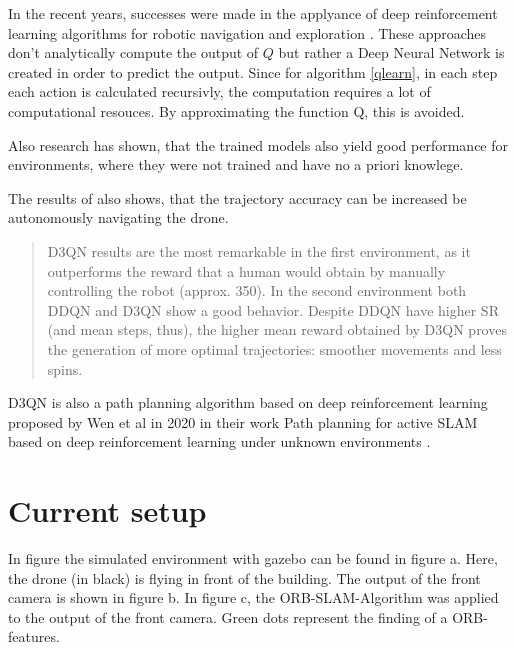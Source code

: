 \begin{enumerate}
	

	
	In the recent years, successes were made in the applyance of deep reinforcement learning algorithms for robotic navigation and exploration \cite{deep} \cite{accurat}. 
	These approaches don't analytically compute the output of $Q$ but rather a Deep Neural Network is created in order to predict the output. 
	Since for algorithm \ref{qlearn}, in each step each action is calculated recursivly, the computation requires a lot of computational resouces. By approximating the function Q, this is avoided. 
	
	Also research has shown, that the trained models also yield good performance for environments, where they were not trained and have no a priori knowlege. 

	
	The results of \cite{deep} also shows, that the trajectory accuracy can be increased be autonomously navigating the drone. 
	\begin{quote}
	
	D3QN results are the most remarkable in the first environment, as it
outperforms the reward that a human would obtain by manually controlling the robot (approx. 350). In the
second environment both DDQN and D3QN show a good behavior. Despite DDQN have higher SR
(and mean steps, thus), the higher mean reward obtained by D3QN proves the generation of more
optimal trajectories: smoother movements and less spins. \cite{deep}
	\end{quote}
	D3QN is also a path planning algorithm based on deep reinforcement learning proposed by Wen et al in 2020 in their work Path planning for 
	active SLAM based on deep reinforcement learning under unknown environments \cite{accurat}.
	
	\end{enumerate}
	

	
	
	\section{Current setup}
	
	In figure \cite{fig:simfigs} the simulated environment with gazebo can be found in figure a. Here, the drone (in black) is flying in front of the building. 
	The output of the front camera is shown in figure b. In figure c, the ORB-SLAM-Algorithm was applied to the output of the front camera. Green dots represent the 
	finding of a ORB-features.
	

